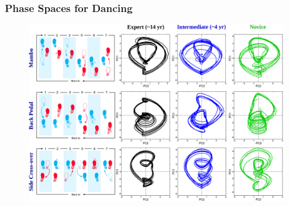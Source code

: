 \documentclass{beamer}
\begin{document}
\begin{frame}
\frametitle{Phase Spaces for Dancing}
\vspace{-0.6cm}
\begin{figure}
\includegraphics[scale=0.029]{results_v11} \\
\end{figure}  
\end{frame}

% 
% 
% 
% 
% 



% 
% 
% 
% 
% 
% 
\end{document}
